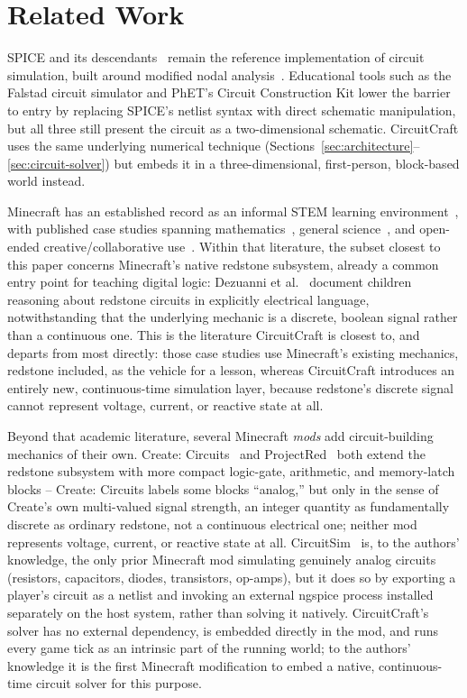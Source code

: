 \section{Related Work}
\label{sec:related-work}

SPICE and its descendants~\cite{nagel1973spice} remain the reference implementation of
circuit simulation, built around modified nodal analysis~\cite{ho1975mna}. Educational tools
such as the Falstad circuit simulator and PhET's Circuit Construction Kit lower the barrier
to entry by replacing SPICE's netlist syntax with direct schematic manipulation, but all
three still present the circuit as a two-dimensional schematic. CircuitCraft uses the same
underlying numerical technique (Sections~\ref{sec:architecture}--\ref{sec:circuit-solver})
but embeds it in a three-dimensional, first-person, block-based world instead.

Minecraft has an established record as an informal STEM learning
environment~\cite{nebel2016mining,sitzmann2011meta}, with published case studies spanning
mathematics~\cite{bos2014mathematics}, general science~\cite{short2012teaching}, and
open-ended creative/collaborative use~\cite{cipollone2014creative,callaghan2016investigating}.
Within that literature, the subset closest to this paper concerns Minecraft's native redstone
subsystem, already a common entry point for teaching digital logic: Dezuanni et
al.~\cite{dezuanni2015redstone} document children reasoning about redstone circuits in
explicitly electrical language, notwithstanding that the underlying mechanic is a discrete,
boolean signal rather than a continuous one. This is the literature CircuitCraft is closest
to, and departs from most directly: those case studies use Minecraft's existing mechanics,
redstone included, as the vehicle for a lesson, whereas CircuitCraft introduces an entirely
new, continuous-time simulation layer, because redstone's discrete signal cannot represent
voltage, current, or reactive state at all.

Beyond that academic literature, several Minecraft \emph{mods} add circuit-building
mechanics of their own. Create: Circuits~\cite{chocoboyy2026createcircuits} and
ProjectRed~\cite{mrtjp2026projectred} both extend the redstone subsystem with more compact
logic-gate, arithmetic, and memory-latch blocks -- Create: Circuits labels some blocks
``analog,'' but only in the sense of Create's own multi-valued signal strength, an integer
quantity as fundamentally discrete as ordinary redstone, not a continuous electrical one;
neither mod represents voltage, current, or reactive state at all.
CircuitSim~\cite{dankov2026circuitsim} is, to the authors' knowledge, the only prior
Minecraft mod simulating genuinely analog circuits (resistors, capacitors, diodes,
transistors, op-amps), but it does so by exporting a player's circuit as a netlist and
invoking an external ngspice process installed separately on the host system, rather than
solving it natively. CircuitCraft's solver has no external dependency, is embedded directly
in the mod, and runs every game tick as an intrinsic part of the running world; to the
authors' knowledge it is the first Minecraft modification to embed a native, continuous-time
circuit solver for this purpose.

